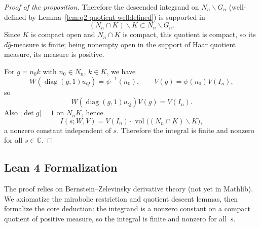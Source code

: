 \begin{proof}[Proof of the proposition]
Therefore the descended integrand on $N_n\backslash G_n$ (well-defined by Lemma~\ref{lem:q2-quotient-welldefined}) is supported in
\[
(N_n\cap K)\backslash K\subset N_n\backslash G_n.
\]
Since $K$ is compact open and $N_n\cap K$ is compact, this quotient is compact, so its $d\bar g$-measure is finite; being nonempty open in the support of Haar quotient measure, its measure is positive.

For $g=n_0k$ with $n_0\in N_n$, $k\in K$, we have
\[
W(\operatorname{diag}(g,1)u_Q)=\psi^{-1}(n_0),
\qquad
V(g)=\psi(n_0)V(I_n),
\]
so
\[
W(\operatorname{diag}(g,1)u_Q)V(g)=V(I_n).
\]
Also $|\det g|=1$ on $N_nK$, hence
\[
I(s;W,V)=V(I_n)\cdot\operatorname{vol}\bigl((N_n\cap K)\backslash K\bigr),
\]
a nonzero constant independent of $s$. Therefore the integral is finite and nonzero for all $s\in\mathbb C$.
\end{proof}

\subsection*{Lean 4 Formalization}

The proof relies on Bernstein--Zelevinsky derivative theory (not yet in
Mathlib).  We axiomatize the mirabolic restriction and quotient descent
lemmas, then formalize the core deduction: the integrand is a nonzero
constant on a compact quotient of positive measure, so the integral is
finite and nonzero for all~$s$.


